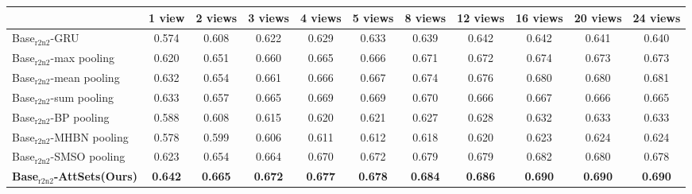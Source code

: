 \documentclass[twocolumn]{svjour3}    \pdfoutput=1
\newcommand{\nickname}{AttSets}
\begin{document}
\begin{table*}[t]
\caption{ Group 1: mean IoU for multi-view reconstruction of all 13 categories in ShapeNet$_{\textrm{r2n2}}$ testing split. All networks are firstly trained given only 1 image for each object in Stage 1. The \nickname{} module is further trained given \textbf{2 images} per object in Stage 2, while other competing approaches are fine-tuned given \textbf{2 images} per object in Stage 2.}
\centering
\label{tab:iou_r2n2_02v}
\tabcolsep=0.125cm
\begin{tabular}{ l|cccccccccc}
\hline
&1 view&2 views&3 views& 4 views&5 views&8 views&12 views&16 views&20 views&24 views \\
\hline
Base$_{\textrm{r2n2}}$-GRU &0.574&0.608&0.622&0.629&0.633&0.639&0.642&0.642&0.641&0.640 \\
Base$_{\textrm{r2n2}}$-max pooling &0.620&0.651&0.660&0.665&0.666&0.671&0.672&0.674&0.673&0.673 \\
Base$_{\textrm{r2n2}}$-mean pooling &0.632&0.654&0.661&0.666&0.667&0.674&0.676&0.680&0.680&0.681 \\
Base$_{\textrm{r2n2}}$-sum pooling &0.633&0.657&0.665&0.669&0.669&0.670&0.666&0.667&0.666&0.665 \\
Base$_{\textrm{r2n2}}$-BP pooling &0.588&0.608&0.615&0.620&0.621&0.627&0.628&0.632&0.633&0.633 \\
Base$_{\textrm{r2n2}}$-MHBN pooling &0.578&0.599&0.606&0.611&0.612&0.618&0.620&0.623&0.624&0.624 \\
Base$_{\textrm{r2n2}}$-SMSO pooling &0.623&0.654&0.664&0.670&0.672&0.679&0.679&0.682&0.680&0.678 \\
\textbf{Base$_{\textrm{r2n2}}$-\nickname{}(Ours)} &\textbf{0.642}&\textbf{0.665}&\textbf{0.672}&\textbf{0.677}&\textbf{0.678}&\textbf{0.684}
&\textbf{0.686}&\textbf{0.690}&\textbf{0.690}&\textbf{0.690} \\
\hline
\end{tabular}
\vspace{-0.1 cm}
\end{table*}
\end{document}
